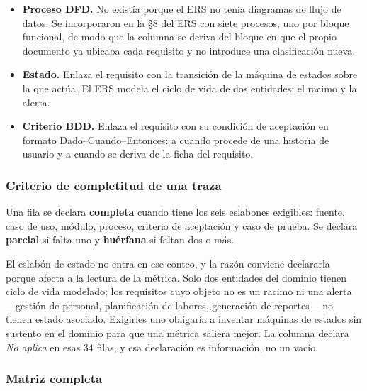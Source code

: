 \begin{itemize}[leftmargin=*, nosep]
  \item \textbf{Proceso DFD.} No existía porque el ERS no tenía diagramas de flujo de datos. Se
        incorporaron en la \S8 del ERS con siete procesos, uno por bloque funcional, de modo que la
        columna se deriva del bloque en que el propio documento ya ubicaba cada requisito y no
        introduce una clasificación nueva.
  \item \textbf{Estado.} Enlaza el requisito con la transición de la máquina de estados sobre la que
        actúa. El ERS modela el ciclo de vida de dos entidades: el racimo y la alerta.
  \item \textbf{Criterio BDD.} Enlaza el requisito con su condición de aceptación en formato
        Dado--Cuando--Entonces:  a  cuando procede de una historia de usuario y
         a  cuando se deriva de la ficha del requisito.
\end{itemize}

\subsubsection*{Criterio de completitud de una traza}

Una fila se declara \textbf{completa} cuando tiene los seis eslabones exigibles: fuente, caso de uso,
módulo, proceso, criterio de aceptación y caso de prueba. Se declara \textbf{parcial} si falta uno y
\textbf{huérfana} si faltan dos o más.

El eslabón de estado no entra en ese conteo, y la razón conviene declararla porque afecta a la
lectura de la métrica. Solo dos entidades del dominio tienen ciclo de vida modelado; los requisitos
cuyo objeto no es un racimo ni una alerta ---gestión de personal, planificación de labores,
generación de reportes--- no tienen estado asociado. Exigirles uno obligaría a inventar máquinas de
estados sin sustento en el dominio para que una métrica saliera mejor. La columna declara
\emph{No aplica} en esas 34 filas, y esa declaración es información, no un vacío.

\subsubsection*{Matriz completa}

